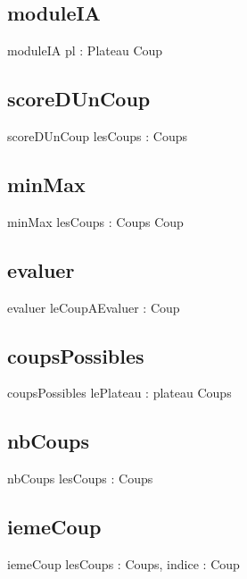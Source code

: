 	\subsection{moduleIA}
\begin{algorithme}
	\signaturefonction
	{moduleIA}
	{pl : Plateau}
	{Coup}
\end{algorithme}
	\subsection{scoreDUnCoup}
\begin{algorithme}
	\signaturefonction
	{scoreDUnCoup}
	{lesCoups : Coups}
	{\naturel}
\end{algorithme}
	\subsection{minMax}
\begin{algorithme}
	\signaturefonction
	{minMax}
	{lesCoups : Coups}
	{Coup}
\end{algorithme}

	\subsection{evaluer}
\begin{algorithme}
	\signaturefonction
	{evaluer}
	{leCoupAEvaluer : Coup}
	{\naturel}
\end{algorithme}

	\subsection{coupsPossibles}
\begin{algorithme}
	\signaturefonction
	{coupsPossibles}
	{lePlateau : plateau}
	{Coups}
\end{algorithme}

	\subsection{nbCoups}
\begin{algorithme}
	\signaturefonction
	{nbCoups}
	{lesCoups : Coups}
	{\naturel}
\end{algorithme}

	\subsection{iemeCoup}
\begin{algorithme}
	\signaturefonction
	{iemeCoup}
	{lesCoups : Coups, indice : \naturelNonNul}
	{Coup}
\end{algorithme}
